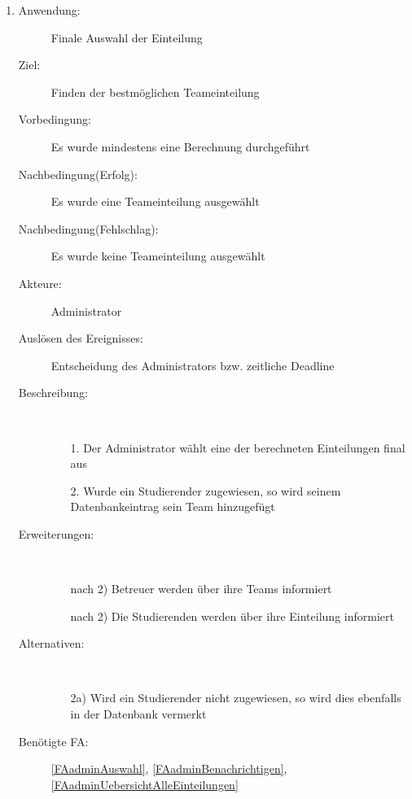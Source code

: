 \documentclass[parskip=full]{scrartcl}
\newcommand{\swtLabel}[1]{\textbf{/#1\arabic*0/}}
\begin{document}
\begin{enumerate} [label=\swtLabel{A}]
  
  \item \label{UCadminEinteilungAuswahl}
  \begin{description}
  \item[Anwendung:] Finale Auswahl der Einteilung
  \item[Ziel:] Finden der bestmöglichen Teameinteilung
  	\item[Vorbedingung:] Es wurde mindestens eine Berechnung durchgeführt
  	\item[Nachbedingung(Erfolg):] Es wurde eine Teameinteilung ausgewählt
  	\item[Nachbedingung(Fehlschlag):] Es wurde keine Teameinteilung ausgewählt
  	\item[Akteure:] Administrator
  	\item[Auslösen des Ereignisses:] Entscheidung des Administrators bzw.
  	zeitliche Deadline
  	\item[Beschreibung:]~
  	\begin{enumerate} 
  	  \item[1.] Der Administrator wählt eine der berechneten Einteilungen final aus
  	  \item[2.] Wurde ein Studierender zugewiesen, so wird seinem
  	  Datenbankeintrag sein Team hinzugefügt
  	\end{enumerate}
  	\item[Erweiterungen:]~
  	\begin{enumerate}
  	  \item[nach 2)] Betreuer werden über ihre Teams informiert
  	  \item[nach 2)] Die Studierenden werden über ihre Einteilung informiert
  	 \end{enumerate}
  	\item[Alternativen:] ~
  	\begin{enumerate}
  	  \item[2a)] Wird ein Studierender nicht zugewiesen, so wird dies ebenfalls
  	  in der Datenbank vermerkt
  	 \end{enumerate}  
  	 \item[Benötigte FA:] \ref{FAadminAuswahl},
  	 \ref{FAadminBenachrichtigen}, \ref{FAadminUebersichtAlleEinteilungen} 
  \end{description}
  

\end{enumerate}
\end{document}
